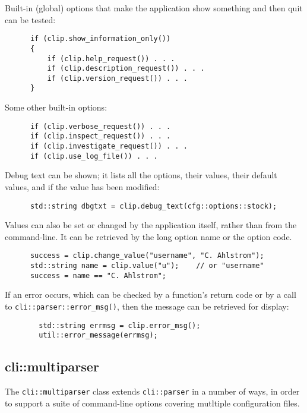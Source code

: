    Built-in (global) options that make the application show something and
   then quit can be tested:

   \begin{verbatim}
      if (clip.show_information_only())
      {
          if (clip.help_request()) . . .
          if (clip.description_request()) . . .
          if (clip.version_request()) . . .
      }
   \end{verbatim}

   Some other built-in options:

   \begin{verbatim}
      if (clip.verbose_request()) . . .
      if (clip.inspect_request()) . . .
      if (clip.investigate_request()) . . .
      if (clip.use_log_file()) . . .
   \end{verbatim}

   Debug text can be shown; it lists all the options, their values, their
   default values, and if the value has been modified:

   \begin{verbatim}
      std::string dbgtxt = clip.debug_text(cfg::options::stock);
   \end{verbatim}

   Values can also be set or changed by the application itself, rather
   than from the command-line. It can be retrieved by the long option
   name or the option code.

   \begin{verbatim}
      success = clip.change_value("username", "C. Ahlstrom");
      std::string name = clip.value("u");    // or "username"
      success = name == "C. Ahlstrom";
   \end{verbatim}

   If an error occurs, which can be checked by a function's return code
   or by a call to \texttt{cli::parser::error\_msg()}, then the message can
   be retrieved for display:

   \begin{verbatim}
        std::string errmsg = clip.error_msg();
        util::error_message(errmsg);
   \end{verbatim}

\subsection{cli::multiparser}
\label{subsec:cli_namespace_multiparser}

   The \texttt{cli::multiparser} class extends \texttt{cli::parser} in
   a number of ways, in order to support a suite of command-line options
   covering mutltiple configuration files.

